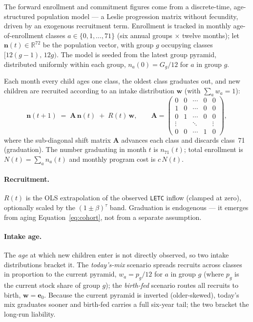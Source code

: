 The forward enrollment and commitment figures come from a discrete-time,
age-structured population model --- a Leslie progression matrix without fecundity,
driven by an exogenous recruitment term. Enrollment is tracked in monthly
age-of-enrollment classes $a \in \{0,1,\dots,71\}$ (six annual groups
$\times$ twelve months); let $\mathbf{n}(t) \in \mathbb{R}^{72}$ be the population
vector, with group $g$ occupying classes $[12(g-1),\,12g)$. The model is seeded from
the latest group pyramid, distributed uniformly within each group,
$n_a(0) = G_g/12$ for $a$ in group $g$.

Each month every child ages one class, the oldest class graduates out, and new
children are recruited according to an intake distribution $\mathbf{w}$ (with
$\sum_a w_a = 1$):
\begin{equation}
\mathbf{n}(t+1) \;=\; \mathbf{A}\,\mathbf{n}(t) \;+\; R(t)\,\mathbf{w},
\qquad
\mathbf{A} =
\begin{pmatrix}
0 & 0 & \cdots & 0 & 0 \\
1 & 0 & \cdots & 0 & 0 \\
0 & 1 & \cdots & 0 & 0 \\
\vdots & & \ddots & & \vdots \\
0 & 0 & \cdots & 1 & 0
\end{pmatrix},
\label{eq:cohort}
\end{equation}
where the sub-diagonal shift matrix $\mathbf{A}$ advances each class and discards
class~71 (graduation). The number graduating in month $t$ is $n_{71}(t)$; total
enrollment is $N(t) = \sum_a n_a(t)$ and monthly program cost is $c\,N(t)$.

\paragraph{Recruitment.} $R(t)$ is the OLS extrapolation of the observed
\texttt{LETC} inflow (clamped at zero), optionally scaled by the
$(1\pm\beta)^{\tau}$ band. Graduation is endogenous --- it emerges from aging
Equation~\eqref{eq:cohort}, not from a separate assumption.

\paragraph{Intake age.} The \emph{age} at which new children enter is not directly
observed, so two intake distributions bracket it. The \emph{today's-mix} scenario
spreads recruits across classes in proportion to the current pyramid,
$w_a = p_g/12$ for $a$ in group $g$ (where $p_g$ is the current stock share of
group $g$); the \emph{birth-fed} scenario routes all recruits to birth,
$\mathbf{w} = \mathbf{e}_0$. Because the current pyramid is inverted (older-skewed),
today's mix graduates sooner and birth-fed carries a full six-year tail; the two
bracket the long-run liability.

